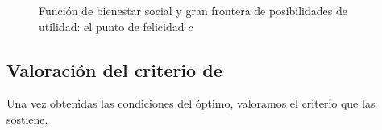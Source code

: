 \documentclass[11pt]{article}
\begin{document}
\begin{figure}[H]
\centering
\caption{Función de bienestar social y gran frontera de posibilidades de utilidad: el punto de felicidad $c$}\label{fig:fbs-gfpu}
\end{figure}

\subsection{Valoración del criterio de }\label{sec:valoracion-pareto}

Una vez obtenidas las condiciones del óptimo, valoramos el criterio que las sostiene.
\end{document}
